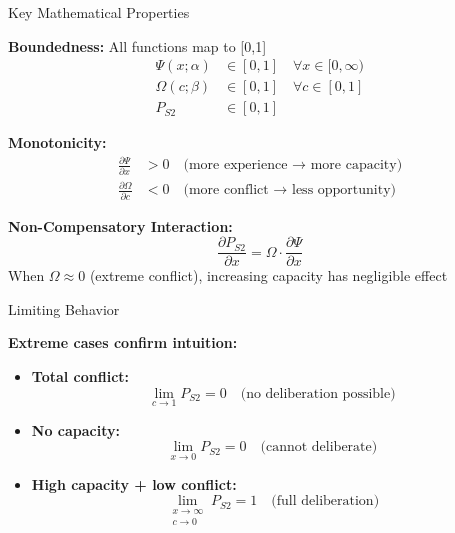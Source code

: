 \documentclass[aspectratio=169]{beamer}
\begin{document}
\begin{frame}{Key Mathematical Properties}

\textbf{Boundedness:} All functions map to [0,1]
\begin{align*}
\Psi(x; \alpha) &\in [0, 1] \quad \forall x \in [0, \infty) \\
\Omega(c; \beta) &\in [0, 1] \quad \forall c \in [0, 1] \\
P_{S2} &\in [0, 1]
\end{align*}

\textbf{Monotonicity:}
\begin{align*}
\frac{\partial \Psi}{\partial x} &> 0 \quad \text{(more experience → more capacity)} \\
\frac{\partial \Omega}{\partial c} &< 0 \quad \text{(more conflict → less opportunity)}
\end{align*}

\textbf{Non-Compensatory Interaction:}
\begin{equation*}
\frac{\partial P_{S2}}{\partial x} = \Omega \cdot \frac{\partial \Psi}{\partial x}
\end{equation*}
When $\Omega \approx 0$ (extreme conflict), increasing capacity has negligible effect

\end{frame}

\begin{frame}{Limiting Behavior}

\textbf{Extreme cases confirm intuition:}

\vspace{0.5em}

\begin{itemize}
    \item \textbf{Total conflict:}
    \begin{equation*}
    \lim_{c \to 1} P_{S2} = 0 \quad \text{(no deliberation possible)}
    \end{equation*}
    
    \item \textbf{No capacity:}
    \begin{equation*}
    \lim_{x \to 0} P_{S2} = 0 \quad \text{(cannot deliberate)}
    \end{equation*}
    
    \item \textbf{High capacity + low conflict:}
    \begin{equation*}
    \lim_{\substack{x \to \infty \\ c \to 0}} P_{S2} = 1 \quad \text{(full deliberation)}
    \end{equation*}
\end{itemize}

\end{frame}
\end{document}
